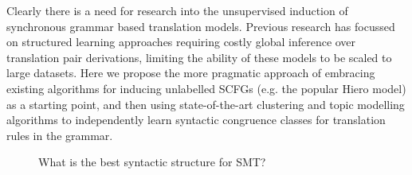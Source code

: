 \documentclass[10pt]{article}
\begin{document}
Clearly there is a need for research into the unsupervised induction of synchronous grammar based translation models.
Previous research has focussed on structured learning approaches requiring costly global inference over translation pair derivations, limiting the ability of these models to be scaled to large datasets.
Here we propose the more pragmatic approach of embracing existing algorithms for inducing unlabelled SCFGs (e.g. the popular Hiero model) as a starting point, and then using state-of-the-art clustering and topic modelling algorithms to independently learn syntactic congruence classes for translation rules in the grammar.

\begin{figure}
\caption{What is the best syntactic structure for SMT?}
\label{fig:models}
\end{figure}
\end{document}
